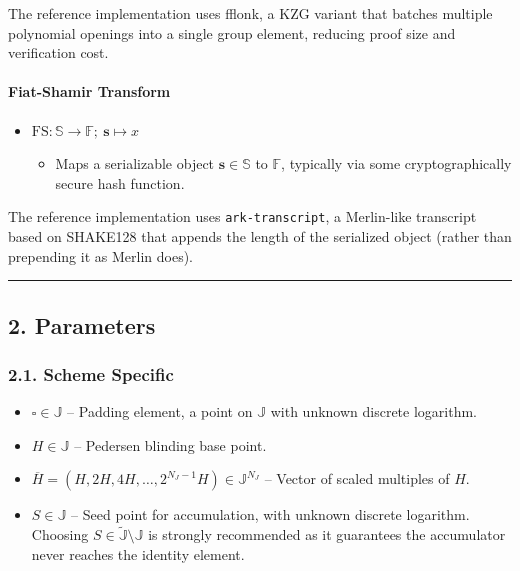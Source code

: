 \documentclass[
]{article}
\providecommand{\tightlist}{%
  \setlength{\itemsep}{0pt}\setlength{\parskip}{0pt}}
\begin{document}
The reference implementation uses fflonk, a KZG variant that batches
multiple polynomial openings into a single group element, reducing proof
size and verification cost.

\paragraph{Fiat-Shamir Transform}\label{fiat-shamir-transform}

\begin{itemize}
\tightlist
\item
  \(\text{FS}: \mathbb{S} \to \mathbb{F};\ \textbf{s} \mapsto x\)

  \begin{itemize}
  \tightlist
  \item
    Maps a serializable object \(\textbf{s} \in \mathbb{S}\) to
    \(\mathbb{F}\), typically via some cryptographically secure hash
    function.
  \end{itemize}
\end{itemize}

The reference implementation uses \texttt{ark-transcript}, a Merlin-like
transcript based on SHAKE128 that appends the length of the serialized
object (rather than prepending it as Merlin does).

\begin{center}\rule{0.5\linewidth}{0.5pt}\end{center}

\subsection{2. Parameters}\label{parameters}

\subsubsection{2.1. Scheme Specific}\label{scheme-specific}

\begin{itemize}
\tightlist
\item
  \(\square \in \mathbb{J}\) -- Padding element, a point on
  \(\mathbb{J}\) with unknown discrete logarithm.
\item
  \(H \in \mathbb{J}\) -- Pedersen blinding base point.
\item
  \(\overline{H} = (H, 2H, 4H, \ldots, 2^{N_J-1}H) \in \mathbb{J}^{N_J}\)
  -- Vector of scaled multiples of \(H\).
\item
  \(S \in \mathbb{J}\) -- Seed point for accumulation, with unknown
  discrete logarithm. Choosing
  \(S \in \tilde{\mathbb{J}} \setminus \mathbb{J}\) is strongly
  recommended as it guarantees the accumulator never reaches the
  identity element.
\end{itemize}
\end{document}
